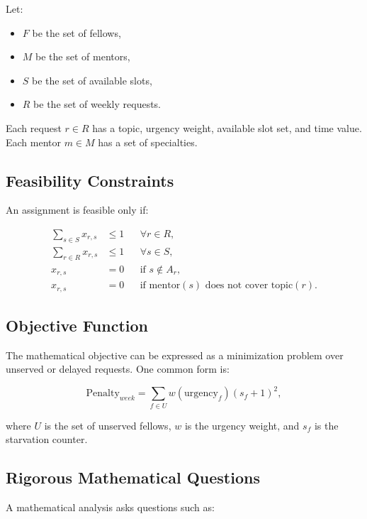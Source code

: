 \documentclass[12pt,a4paper]{article}
\begin{document}
Let:

\begin{itemize}[noitemsep]
    \item $F$ be the set of fellows,
    \item $M$ be the set of mentors,
    \item $S$ be the set of available slots,
    \item $R$ be the set of weekly requests.
\end{itemize}

Each request $r \in R$ has a topic, urgency weight, available slot set, and time value. Each mentor $m \in M$ has a set of specialties.

\subsection{Feasibility Constraints}

An assignment is feasible only if:

\begin{align}
    \sum_{s \in S} x_{r,s} &\leq 1 && \forall r \in R, \\
    \sum_{r \in R} x_{r,s} &\leq 1 && \forall s \in S, \\
    x_{r,s} &= 0 && \text{if } s \notin A_r, \\
    x_{r,s} &= 0 && \text{if mentor}(s) \text{ does not cover topic}(r).
\end{align}

\subsection{Objective Function}

The mathematical objective can be expressed as a minimization problem over unserved or delayed requests. One common form is:

\begin{equation}
    \text{Penalty}_{week}
    =
    \sum_{f \in U}
    w(\text{urgency}_f)(s_f + 1)^2,
\end{equation}

where $U$ is the set of unserved fellows, $w$ is the urgency weight, and $s_f$ is the starvation counter.

\subsection{Rigorous Mathematical Questions}

A mathematical analysis asks questions such as:
\end{document}
